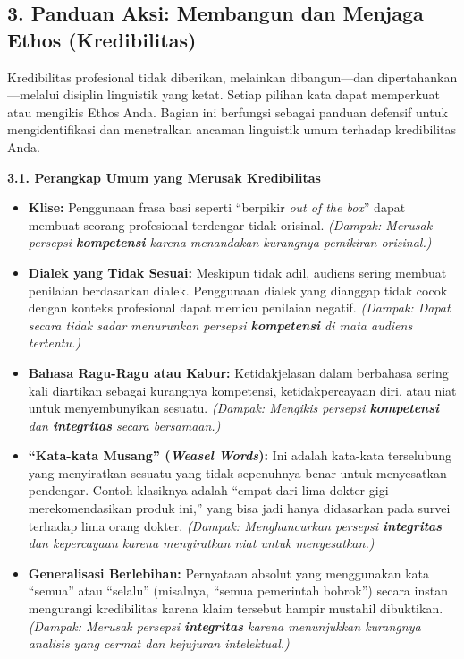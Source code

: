 \documentclass[
  letterpaper,
  DIV=11,
  numbers=noendperiod]{scrreprt}
\begin{document}
\subsection{\texorpdfstring{\textbf{3. Panduan Aksi: Membangun dan
Menjaga Ethos
(Kredibilitas)}}{3. Panduan Aksi: Membangun dan Menjaga Ethos (Kredibilitas)}}\label{panduan-aksi-membangun-dan-menjaga-ethos-kredibilitas}

Kredibilitas profesional tidak diberikan, melainkan dibangun---dan
dipertahankan---melalui disiplin linguistik yang ketat. Setiap pilihan
kata dapat memperkuat atau mengikis Ethos Anda. Bagian ini berfungsi
sebagai panduan defensif untuk mengidentifikasi dan menetralkan ancaman
linguistik umum terhadap kredibilitas Anda.

\textbf{3.1. Perangkap Umum yang Merusak Kredibilitas}

\begin{itemize}
\item
  \textbf{Klise:} Penggunaan frasa basi seperti ``berpikir \emph{out of
  the box}'' dapat membuat seorang profesional terdengar tidak orisinal.
  \emph{(Dampak: Merusak persepsi \textbf{kompetensi} karena menandakan
  kurangnya pemikiran orisinal.)}
\item
  \textbf{Dialek yang Tidak Sesuai:} Meskipun tidak adil, audiens sering
  membuat penilaian berdasarkan dialek. Penggunaan dialek yang dianggap
  tidak cocok dengan konteks profesional dapat memicu penilaian negatif.
  \emph{(Dampak: Dapat secara tidak sadar menurunkan persepsi
  \textbf{kompetensi} di mata audiens tertentu.)}
\item
  \textbf{Bahasa Ragu-Ragu atau Kabur:} Ketidakjelasan dalam berbahasa
  sering kali diartikan sebagai kurangnya kompetensi, ketidakpercayaan
  diri, atau niat untuk menyembunyikan sesuatu. \emph{(Dampak: Mengikis
  persepsi \textbf{kompetensi} dan \textbf{integritas} secara
  bersamaan.)}
\item
  \textbf{``Kata-kata Musang'' (\emph{Weasel Words}):} Ini adalah
  kata-kata terselubung yang menyiratkan sesuatu yang tidak sepenuhnya
  benar untuk menyesatkan pendengar. Contoh klasiknya adalah ``empat
  dari lima dokter gigi merekomendasikan produk ini,'' yang bisa jadi
  hanya didasarkan pada survei terhadap lima orang dokter.
  \emph{(Dampak: Menghancurkan persepsi \textbf{integritas} dan
  kepercayaan karena menyiratkan niat untuk menyesatkan.)}
\item
  \textbf{Generalisasi Berlebihan:} Pernyataan absolut yang menggunakan
  kata ``semua'' atau ``selalu'' (misalnya, ``semua pemerintah bobrok'')
  secara instan mengurangi kredibilitas karena klaim tersebut hampir
  mustahil dibuktikan. \emph{(Dampak: Merusak persepsi
  \textbf{integritas} karena menunjukkan kurangnya analisis yang cermat
  dan kejujuran intelektual.)}
\end{itemize}
\end{document}
